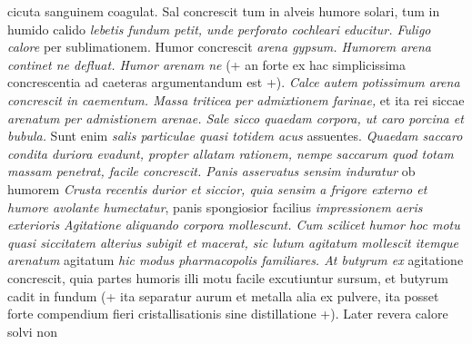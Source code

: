 cicuta\protect{} sanguinem coagulat. Sal concrescit tum in alveis humore solari, tum in humido calido \textit{lebetis fundum petit, unde perforato cochleari\protect{} educitur. Fuligo calore } per sublimationem. Humor concrescit \textit{arena gypsum. Humorem arena continet ne defluat. Humor arenam ne } (+ an forte ex hac simplicissima concrescentia ad caeteras argumentandum est +). 
\textit{Calce autem potissimum arena concrescit in caementum. Massa triticea}
\textit{per admixtionem farinae,\protect{}}
et ita rei siccae
\textit{arenatum per admistionem arenae.\protect{}
Sale sicco quaedam corpora, ut caro porcina\protect{} et bubula.\protect{}}
Sunt enim \textit{salis particulae quasi totidem acus} assuentes.
\textit{Quaedam saccaro\protect{} condita duriora evadunt,
propter allatam rationem, nempe saccarum quod totam massam penetrat, facile concrescit.
Panis\protect{} asservatus sensim induratur}
ob humorem 
\textit{Crusta recentis durior et siccior,
quia sensim a frigore externo et humore avolante humectatur},
panis spongiosior facilius \textit{impressionem aeris exterioris}
\textit{Agitatione aliquando corpora mollescunt. Cum scilicet humor hoc motu quasi siccitatem alterius subigit et macerat, sic lutum agitatum mollescit itemque arenatum} agitatum \textit{hic modus pharmacopolis familiares. At butyrum ex } agitatione concrescit, quia partes humoris illi motu facile excutiuntur sursum, et butyrum cadit in fundum (+ ita separatur aurum et metalla alia ex pulvere, ita posset forte compendium fieri cristallisationis sine distillatione +).
Later revera calore solvi non 
